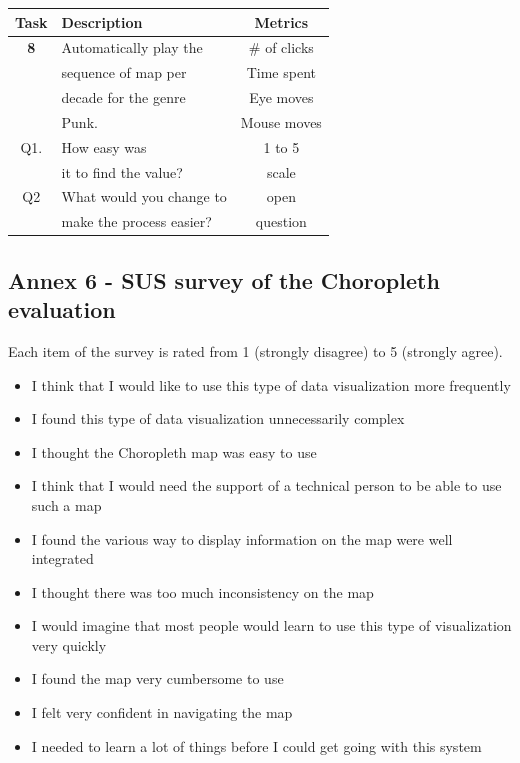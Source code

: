 \documentclass[twocolumn, letterpaper,13pt]{scrartcl}
\begin{document}
    \begin{center}
    \begin{tabular} { | c | l | c | }
    \hline
     Task & Description & Metrics \\
    \hline
    \textbf{8} & Automatically play the & \# of clicks \\
    & sequence of map per & Time spent\\
    & decade for the genre & Eye moves\\
    & Punk. & Mouse moves\\
    \hline
    Q1. & How easy was & 1 to 5\\
    & it to find the value? & scale \\
    \hline
    Q2 & What would you change to & open\\
    & make the process easier? & question\\
    \hline
    \end{tabular}
    \end{center}
    
    \subsection*{Annex 6 - SUS survey of the Choropleth evaluation} 
    
    Each item of the survey is rated from 1 (strongly disagree) to 5 (strongly agree).
    
    \begin{itemize}
        \item I think that I would like to use this type of data visualization more frequently
        \item I found this type of data visualization unnecessarily complex
        \item I thought the Choropleth map was easy to use
        \item I think that I would need the support of a technical person to be able to use such a map
        \item I found the various way to display information on the map were well integrated
        \item I thought there was too much inconsistency on the map
        \item I would imagine that most people would learn to use this type of visualization very quickly
        \item I found the map very cumbersome to use
        \item I felt very confident in navigating the map
        \item I needed to learn a lot of things before I could get going with this system
    \end{itemize}
\end{document}
